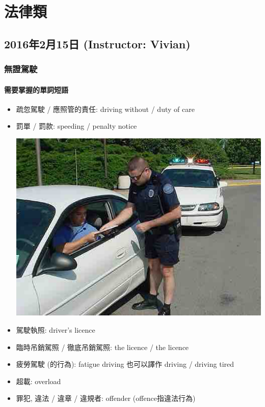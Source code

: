 \chapter{法律類}
\section{2016年2月15日 (Instructor: Vivian)}
\subsection{無證駕駛}
\subsubsection*{需要掌握的單詞短語}
\begin{itemize}
  \itemsep0em
  \item 疏忽駕駛 / 應照管的責任: driving without  / duty of care
  \item 罰單 / 罰款: speeding  / penalty notice
  \begin{center}
    \includegraphics[scale=.5]{pics/speeding-ticket.jpg}
  \end{center}
  \item 駕駛執照: driver’s licence
  \item 臨時吊銷駕照 / 徹底吊銷駕照:  the licence /  the licence
  \item 疲勞駕駛 (的行為): fatigue driving 也可以譯作  driving / driving tired
  \item 超載: overload
  \item 罪犯, 違法 / 違章 / 違規者: offender (offence指違法行為)

\end{itemize}
